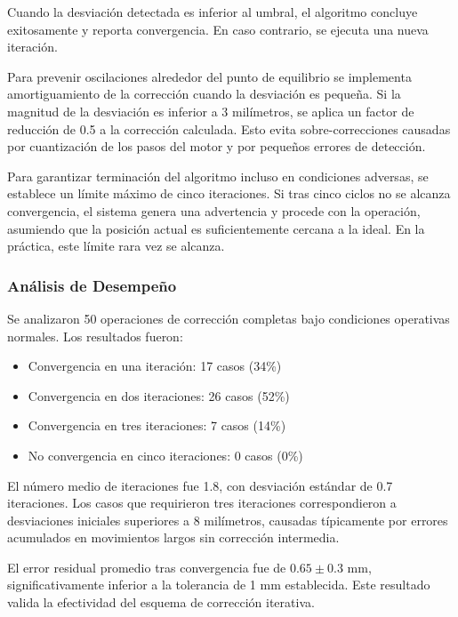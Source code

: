 Cuando la desviación detectada es inferior al umbral, el algoritmo concluye exitosamente y reporta convergencia. En caso contrario, se ejecuta una nueva iteración.

Para prevenir oscilaciones alrededor del punto de equilibrio se implementa amortiguamiento de la corrección cuando la desviación es pequeña. Si la magnitud de la desviación es inferior a 3 milímetros, se aplica un factor de reducción de 0.5 a la corrección calculada. Esto evita sobre-correcciones causadas por cuantización de los pasos del motor y por pequeños errores de detección.

Para garantizar terminación del algoritmo incluso en condiciones adversas, se establece un límite máximo de cinco iteraciones. Si tras cinco ciclos no se alcanza convergencia, el sistema genera una advertencia y procede con la operación, asumiendo que la posición actual es suficientemente cercana a la ideal. En la práctica, este límite rara vez se alcanza.

\subsubsection{Análisis de Desempeño}

Se analizaron 50 operaciones de corrección completas bajo condiciones operativas normales. Los resultados fueron:

\begin{itemize}[label=$\bullet$]
\item Convergencia en una iteración: 17 casos (34\%)
\item Convergencia en dos iteraciones: 26 casos (52\%)
\item Convergencia en tres iteraciones: 7 casos (14\%)
\item No convergencia en cinco iteraciones: 0 casos (0\%)
\end{itemize}

El número medio de iteraciones fue 1.8, con desviación estándar de 0.7 iteraciones. Los casos que requirieron tres iteraciones correspondieron a desviaciones iniciales superiores a 8 milímetros, causadas típicamente por errores acumulados en movimientos largos sin corrección intermedia.

El error residual promedio tras convergencia fue de $0.65 \pm 0.3$ mm, significativamente inferior a la tolerancia de 1 mm establecida. Este resultado valida la efectividad del esquema de corrección iterativa.


